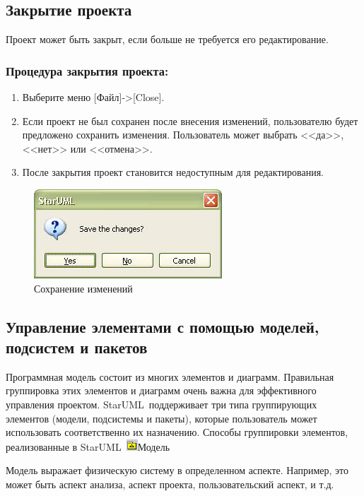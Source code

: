 \documentclass[a4paper,12pt]{report}
\newcommand{\staruml}{StarUML\,\tm}
\begin{document}
\subsection*{Закрытие проекта}
Проект может быть закрыт, если больше не требуется его редактирование.
\subsubsection*{Процедура закрытия проекта:}
\begin{enumerate}
	\item Выберите меню [Файл]->[Close].
	\item Если проект не был сохранен после внесения изменений, пользователю будет предложено
	сохранить изменения. Пользователь может выбрать <<да>>, <<нет>> или <<отмена>>.
	\item После закрытия проект становится недоступным для редактирования.
\end{enumerate}
\begin{figure}[h!]
	\centering
	\includegraphics[width=0.7\linewidth]{images/closeproject1}
	\caption{Сохранение изменений}
	\label{fig:closeproject1}
\end{figure}


\subsection*{Управление элементами с помощью моделей, подсистем и пакетов}
Программная модель состоит из многих элементов и диаграмм. Правильная группировка этих
элементов и диаграмм очень важна для эффективного управления проектом. \staruml
поддерживает три типа группирующих элементов (модели, подсистемы и пакеты), которые
пользователь может использовать соответственно их назначению.
Способы группировки элементов, реализованные в \staruml
\newpage
\includegraphics[width=3ex]{images/folder}Модель

Модель выражает физическую систему в определенном аспекте. Например, это может быть аспект
анализа, аспект проекта, пользовательский аспект, и т.д.
\end{document}
